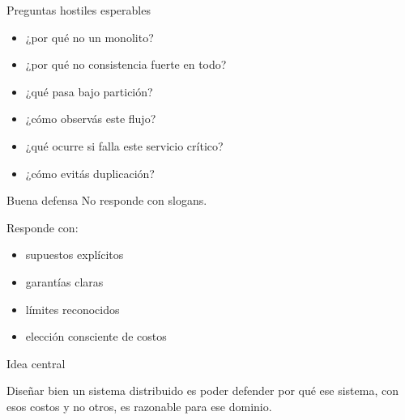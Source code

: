 \documentclass[institutional,screen,none]{ua-engineering-v6-beamer}
\begin{document}
\begin{frame}{Preguntas hostiles esperables}
\begin{itemize}
\item ¿por qué no un monolito?
\item ¿por qué no consistencia fuerte en todo?
\item ¿qué pasa bajo partición?
\item ¿cómo observás este flujo?
\item ¿qué ocurre si falla este servicio crítico?
\item ¿cómo evitás duplicación?
\end{itemize}
\end{frame}

\begin{frame}{Buena defensa}
No responde con slogans.

\pause

Responde con:
\begin{itemize}
\item supuestos explícitos
\item garantías claras
\item límites reconocidos
\item elección consciente de costos
\end{itemize}
\end{frame}


\begin{frame}{Idea central}
\begin{block}{}
Diseñar bien un sistema distribuido es poder defender por qué ese sistema, con esos costos y no otros, es razonable para ese dominio.
\end{block}
\end{frame}
\end{document}
